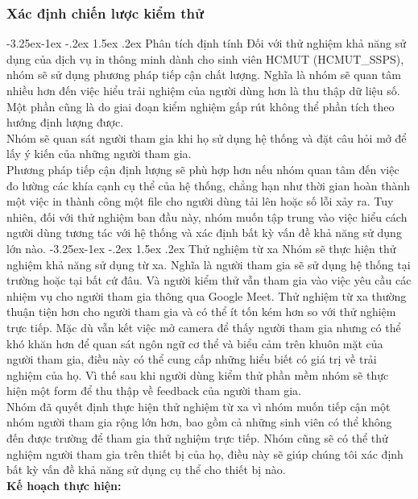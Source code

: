 \documentclass[a4paper]{article}
\makeatletter
\newcounter {subsubsubsection}[subsubsection]
\newcommand\subsubsubsection{\@startsection{subsubsubsection}{4}{\z@}%
                                     {-3.25ex\@plus -1ex \@minus -.2ex}%
                                     {1.5ex \@plus .2ex}%
                                     {\normalfont\normalsize\bfseries}}
\makeatother
\begin{document}
\subsubsection{Xác định chiến lược kiểm thử}
\subsubsubsection{Phân tích định tính}
Đối với thử nghiệm khả năng sử dụng của dịch vụ in thông minh dành cho sinh viên HCMUT (HCMUT\_SSPS), nhóm sẽ sử dụng phương pháp tiếp cận chất lượng. Nghĩa là nhóm sẽ quan tâm nhiều hơn đến việc hiểu trải nghiệm của người dùng hơn là thu thập dữ liệu số. Một phần cũng là do giai đoạn kiểm nghiệm gấp rút không thể phần tích theo hướng định lượng được.\\
Nhóm sẽ quan sát người tham gia khi họ sử dụng hệ thống và đặt câu hỏi mở để lấy ý kiến của những người tham gia.\\
Phương pháp tiếp cận định lượng sẽ phù hợp hơn nếu nhóm quan tâm đến việc đo lường các khía cạnh cụ thể của hệ thống, chẳng hạn như thời gian hoàn thành một việc in thành công một file cho người dùng tải lên hoặc số lỗi xảy ra. Tuy nhiên, đối với thử nghiệm ban đầu này, nhóm muốn tập trung vào việc hiểu cách người dùng tương tác với hệ thống và xác định bất kỳ vấn đề khả năng sử dụng lớn nào.
\subsubsubsection{Thử nghiệm từ xa}
Nhóm sẽ thực hiện thử nghiệm khả năng sử dụng từ xa. Nghĩa là người tham gia sẽ sử dụng hệ thống tại trường hoặc tại bất cứ đâu. Và người kiểm thử vẫn tham gia vào việc yêu cầu các nhiệm vụ cho người tham gia thông qua Google Meet. Thử nghiệm từ xa thường thuận tiện hơn cho người tham gia và có thể ít tốn kém hơn so với thử nghiệm trực tiếp. Mặc dù vẫn kết việc mở camera để thấy người tham gia nhưng có thể khó khăn hơn để quan sát ngôn ngữ cơ thể và biểu cảm trên khuôn mặt của người tham gia, điều này có thể cung cấp những hiểu biết có giá trị về trải nghiệm của họ. Vì thế sau khi người dùng kiểm thử phần mềm nhóm sẽ thực hiện một form để thu thập về feedback của người tham gia.\\
Nhóm đã quyết định thực hiện thử nghiệm từ xa vì nhóm muốn tiếp cận một nhóm người tham gia rộng lớn hơn, bao gồm cả những sinh viên có thể không đến được trường để tham gia thử nghiệm trực tiếp. Nhóm cũng sẽ có thể thử nghiệm người tham gia trên thiết bị của họ, điều này sẽ giúp chúng tôi xác định bất kỳ vấn đề khả năng sử dụng cụ thể cho thiết bị nào.\\
\textbf{Kế hoạch thực hiện: }
\end{document}

